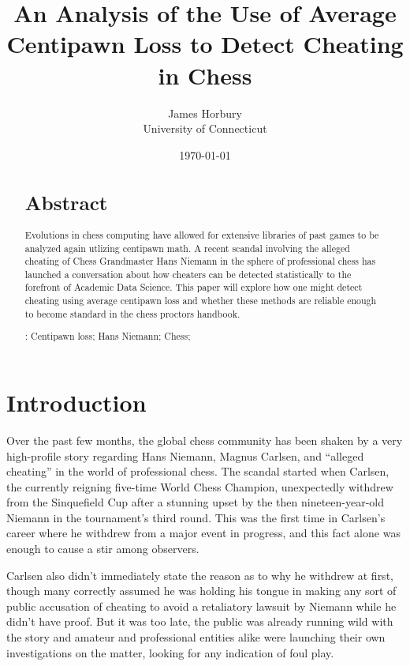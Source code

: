 \documentclass[12pt, letterpaper, titlepage]{article}
\title{An Analysis of the Use of Average Centipawn Loss to Detect Cheating in Chess}
\author{James Horbury\\
    University of Connecticut
}
\date{\today}
\begin{document}
\maketitle

\doublespace

\begin{abstract}
\section*{Abstract}
\label{sec:abs}

Evolutions in chess computing have allowed for extensive libraries of past games to be analyzed again utlizing centipawn math. A recent scandal involving the alleged cheating of Chess Grandmaster Hans Niemann in the sphere of professional chess has launched a conversation about how cheaters can be detected statistically to the forefront of Academic Data Science. This paper will explore how one might detect cheating using average centipawn loss and whether these methods are reliable enough to become standard in the chess proctors handbook.

\bigskip
\noindent{}:
Centipawn loss; 
Hans Niemann;
Chess;
\end{abstract}

\section*{Introduction}
\label{sec:intro}

Over the past few months, the global chess community has been shaken by a very high-profile story regarding Hans Niemann, Magnus Carlsen,  and “alleged cheating” in the world of professional chess. The scandal started when Carlsen, the currently reigning five-time World Chess Champion, unexpectedly withdrew from the Sinquefield Cup after a stunning upset by the then nineteen-year-old Niemann in the tournament's third round. This was the first time in Carlsen's career where he withdrew from a major event in progress, and this fact alone was enough to cause a stir among observers.

Carlsen also didn't immediately state the reason as to why he withdrew at first, though many correctly assumed he was holding his tongue in making any sort of public accusation of cheating to avoid a retaliatory lawsuit by Niemann while he didn't have proof. But it was too late, the public was already running wild with the story and amateur and professional entities alike were launching their own investigations on the matter, looking for any indication of foul play.
\end{document}
